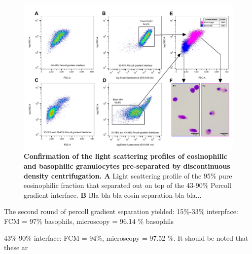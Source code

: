 \begin{figure}[!ht]
    \centering
    \includegraphics[width=1.0\textwidth]{figures/Eosin and Percoll exp/Percoll sep for Inkscape 2.pdf}
    \caption{\textbf{Confirmation of the light scattering profiles of eosinophilic and basophilic granulocytes pre-separated by discontinuous density centrifugation. A} Light scattering profile of the 95\% pure eosinophilic fraction that separated out on top of the 43-90\% Percoll gradient interface. \textbf{B} Bla bla bla eosin separation bla bla...}
    \label{fig:Percoll-dotplots}
\end{figure}

The second round of percoll gradient separation yielded:
15\%-33\% interpface: FCM = 97\% basophils, microscopy = 96.14 \% basophils

43\%-90\% interface: FCM = 94\%, microscopy = 97.52 \%. It should be noted that these ar







